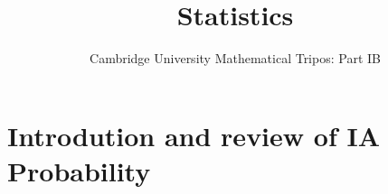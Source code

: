 \documentclass{article}
\title{Statistics}
\author{Cambridge University Mathematical Tripos: Part IB}
\begin{document}
\maketitle

\tableofcontentsnewpage{}

\section{Introdution and review of IA Probability}

\end{document}
